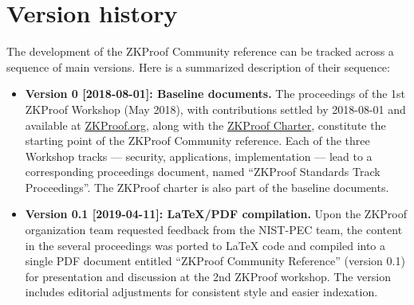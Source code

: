\chapter{Version history}
\label{app:version-history}


The development of the ZKProof Community reference can be tracked across a sequence of main versions.
Here is a summarized description of their sequence:

\begin{itemize}\setlength{\itemsep}{1em}

\item \textbf{Version 0 [2018-08-01]: Baseline documents.}
	The proceedings of the 1st ZKProof Workshop (May 2018), 
with contributions settled by 2018-08-01 and available 
at \href{https://zkproof.org/documents}{ZKProof.org},
along with the \hyperref[sec:prelim:charter]{ZKProof Charter}, 
constitute the starting point of the ZKProof Community reference.
	Each of the three Workshop tracks --- security, applications, implementation --- 
lead to a corresponding proceedings document, 
named ``ZKProof Standards  Track Proceedings''.
	The ZKProof charter is also part of the baseline documents.


\item \textbf{Version 0.1 [2019-04-11]: LaTeX/PDF compilation.}
	Upon the ZKProof organization team requested feedback from the NIST-PEC team, the content in the 
several proceedings was ported to LaTeX code and compiled into a single PDF document entitled 
``ZKProof Community Reference'' (version 0.1) for presentation and discussion at the 2nd ZKProof workshop.
	The version includes editorial adjustments for consistent style and easier indexation. 



\end{itemize}
